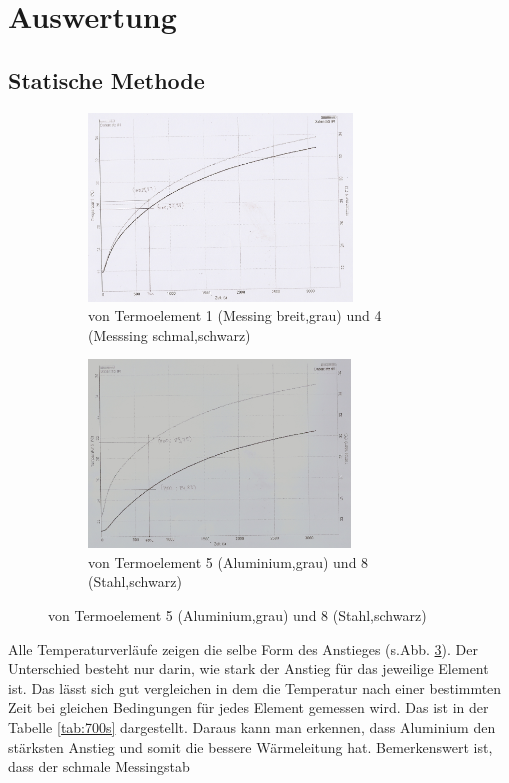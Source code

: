 \section{Auswertung}
\label{sec:Auswertung}
\subsection{Statische Methode}
\begin{figure}
  \centering
  \caption{Temperaturverläufe im statischen Fall}
\begin{subfigure}{0.48\textwidth}
  \centering
  \includegraphics[height= 5cm]{logos/T1T4.jpg}
  \caption{von Termoelement 1 (Messing breit,grau) und 4 (Messsing schmal,schwarz)}
  \label{fig:t1t4}
\end{subfigure}
\begin{subfigure}{0.48\textwidth}
  \centering
  \includegraphics[height= 5cm]{logos/T5T8.jpg}
  \caption{von Termoelement 5 (Aluminium,grau) und 8 (Stahl,schwarz)}
  \label{fig:t5t8}
\end{subfigure}
\label{fig:sfall}
\end{figure}
Alle Temperaturverläufe zeigen die selbe Form des Anstieges (s.Abb.
\ref{fig:sfall}). Der Unterschied besteht
nur darin, wie stark der Anstieg für das jeweilige Element ist. Das lässt sich
gut vergleichen in dem die Temperatur nach einer bestimmten Zeit bei gleichen
Bedingungen für jedes Element gemessen wird. Das ist in der Tabelle \ref{tab:700s}
dargestellt. Daraus kann man erkennen, dass Aluminium den stärksten Anstieg und
somit die bessere Wärmeleitung hat. Bemerkenswert ist, dass der schmale Messingstab
